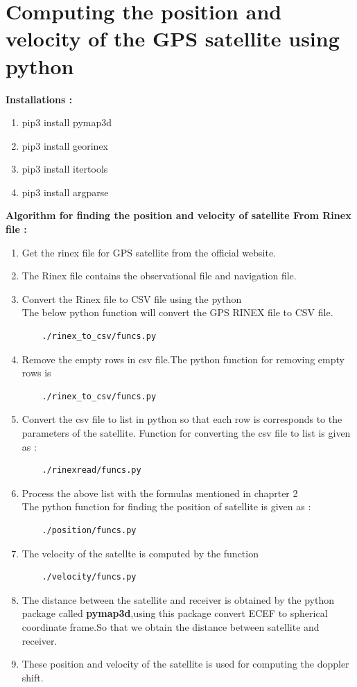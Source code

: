 \documentclass[10pt]{book}
\begin{document}
\section{Computing the position and velocity of the  GPS satellite using python}
\textbf{Installations :}
\begin{enumerate}
\item pip3 install pymap3d
\item pip3 install georinex
\item pip3 install itertools
\item pip3 install argparse
\end{enumerate}
\textbf{Algorithm for finding the position and velocity of satellite From Rinex file :}
\begin{enumerate}
  \item Get the rinex file for GPS  satellite from the official website.
  \item The Rinex file contains the observational file and navigation file.
  \item Convert the Rinex file to CSV file using the python \\
  The below python function will convert the GPS RINEX file to CSV file.
  \begin{lstlisting}
    ./rinex_to_csv/funcs.py
  \end{lstlisting}
  \item Remove the empty rows in csv file.The python function for removing empty rows is 
  \begin{lstlisting}
    ./rinex_to_csv/funcs.py
  \end{lstlisting}
  \item Convert the csv file to list in python so that each row is corresponds to the parameters of the satellite. Function for converting the csv file to list is given as :
  \begin{lstlisting}
    ./rinexread/funcs.py
  \end{lstlisting} 
  \item Process the above list with the formulas mentioned in chaprter 2 \\
  The python function for finding the position of satellite is given as :
  \begin{lstlisting}
    ./position/funcs.py
  \end{lstlisting}
  \item The velocity of the satellte is computed by the function 
  \begin{lstlisting}
    ./velocity/funcs.py
  \end{lstlisting}
  \item The distance between the satellite and receiver is obtained by the python package called \textbf{pymap3d},using this package convert ECEF to spherical coordinate frame.So that we obtain the distance between satellite and receiver.
  \item These position and velocity of the satellite is used for computing the doppler shift.
\end{enumerate}
\end{document}

